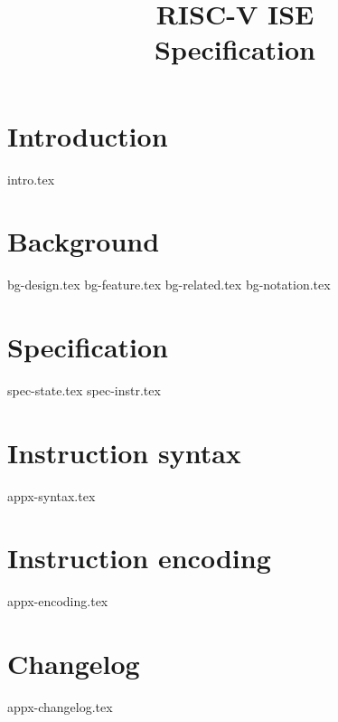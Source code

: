 \documentclass{article}
\title{RISC-V \ISE ISE \\ Specification}
\begin{document}
\maketitle \tableofcontents


\section{Introduction}
\label{sec:intro}

{intro.tex}


\section{Background}
\label{sec:bg}

{bg-design.tex}
{bg-feature.tex}
{bg-related.tex}
{bg-notation.tex}


\section{Specification}
\label{sec:spec}

{spec-state.tex}
{spec-instr.tex}


\newpage
\printbibliography


\appendix

\newpage
\section{Instruction syntax}
\label{appx:syntax}

{appx-syntax.tex}

\newpage
\section{Instruction encoding}
\label{appx:encoding}

{appx-encoding.tex}

\newpage
\section{Changelog}
\label{appx:changelog}

{appx-changelog.tex}

\end{document}
